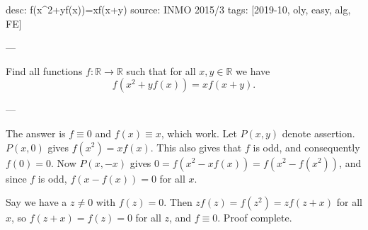 desc: f(x^2+yf(x))=xf(x+y)
source: INMO 2015/3
tags: [2019-10, oly, easy, alg, FE]

---

Find all functions $f:\mathbb R\to\mathbb R$ such that for all $x,y\in\mathbb R$ we have \[f(x^2+yf(x))=xf(x+y).\]

---

The answer is $f\equiv0$ and $f(x)\equiv x$, which work. Let $P(x,y)$ denote assertion. $P(x,0)$ gives $f(x^2)=xf(x)$. This also gives that $f$ is odd, and consequently $f(0)=0$. Now $P(x,-x)$ gives $0=f\left(x^2-xf(x)\right)=f\left(x^2-f(x^2)\right)$, and since $f$ is odd, $f(x-f(x))=0$ for all $x$.

Say we have a $z\ne0$ with $f(z)=0$. Then $zf(z)=f(z^2)=zf(z+x)$ for all $x$, so $f(z+x)=f(z)=0$ for all $z$, and $f\equiv0$. Proof complete.
